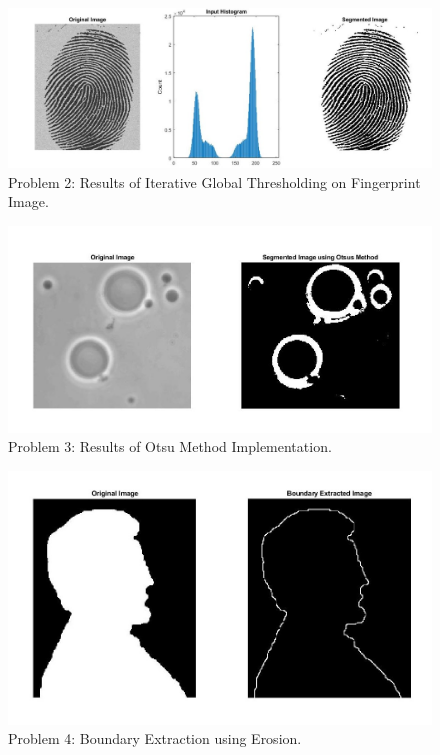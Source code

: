\documentclass[./rarnold_project_89.tex]{subfiles}
\begin{document}
	\clearpage
	
	\begin{figure}[!htbp]
	\centering
	\includegraphics[scale=0.55]{"problem2"}
	\captionsetup{justification=centering}
	\caption{Problem 2: Results of Iterative Global Thresholding on Fingerprint Image.} 
	\label{p2}
	\end{figure}
	
	\begin{figure}[!htbp]
	\centering
	\includegraphics[scale=0.60]{"problem3"}
	\captionsetup{justification=centering}
	\caption{Problem 3: Results of Otsu Method Implementation.} 
	\label{p3}
	\end{figure}
	
	\clearpage
	
	\begin{figure}[!htbp]
	\centering
	\includegraphics[scale=0.60]{"problem4"}
	\captionsetup{justification=centering}
	\caption{Problem 4: Boundary Extraction using Erosion.} 
	\label{p4}
	\end{figure}
	
\end{document}

